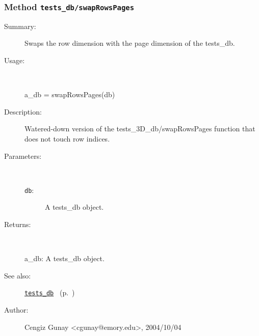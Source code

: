 \subsubsection[Method \texttt{swapRowsPages}]{Method \texttt{tests\_db/swapRowsPages}}%
%
\label{ref_tests_db__swapRowsPages}%
\hypertarget{ref_tests_db__swapRowsPages}{}%
\begin{description}
\item[Summary:]Swaps the row dimension with the page dimension of the tests\_db.
%
\item[Usage:]~%
\begin{lyxcode}%
a\_db = swapRowsPages(db)
%
\end{lyxcode}%
%
\item[Description:]%
Watered-down version of the tests\_3D\_db/swapRowsPages function that
 does not touch row indices. 
\item[Parameters:]~
\begin{description}%
\item[\texttt{db}:]
 A tests\_db object.
\end{description}%
%
\item[Returns:
]~

	a\_db: A tests\_db object.
%
%
\item[See also:]%
\hyperlink{ref_tests_db}{\texttt{tests\_db}}%
\ (p.~\pageref{ref_tests_db})%
%
%
\item[Author:]%
Cengiz Gunay <cgunay@emory.edu>, 2004/10/04
%
\end{description}
\methodline%
